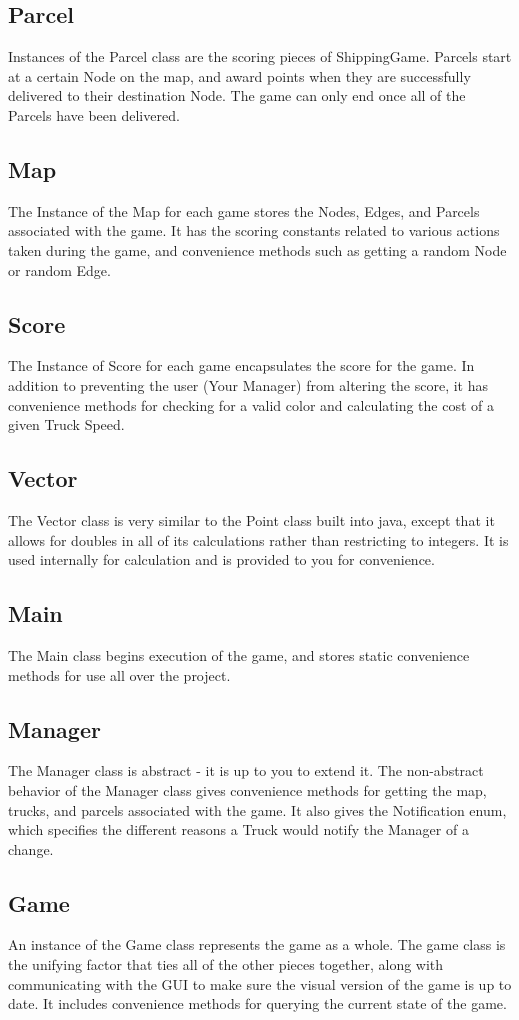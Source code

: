 \documentclass[11pt]{article}
\begin{document}
\subsection{Parcel}
Instances of the Parcel class are the scoring pieces of ShippingGame. Parcels start at a certain Node on the map, and award points when they are successfully delivered to their destination Node. The game can only end once all of the Parcels have been delivered.
\subsection{Map}
The Instance of the Map for each game stores the Nodes, Edges, and Parcels associated with the game. It has the scoring constants related to various actions taken during the game, and convenience methods such as getting a random Node or random Edge.
\subsection{Score}
The Instance of Score for each game encapsulates the score for the game. In addition to preventing the user (Your Manager) from altering the score, it has convenience methods for checking for a valid color and calculating the cost of a given Truck Speed.
\subsection{Vector}
The Vector class is very similar to the Point class built into java, except that it allows for doubles in all of its calculations rather than restricting to integers. It is used internally for calculation and is provided to you for convenience.
\subsection{Main}
The Main class begins execution of the game, and stores static convenience methods for use all over the project.
\subsection{Manager}
The Manager class is abstract - it is up to you to extend it. The non-abstract behavior of the Manager class gives convenience methods for getting the map, trucks, and parcels associated with the game. It also gives the Notification enum, which specifies the different reasons a Truck would notify the Manager of a change.
\subsection{Game}
An instance of the Game class represents the game as a whole. The game class is the unifying factor that ties all of the other pieces together, along with communicating with the GUI to make sure the visual version of the game is up to date. It includes convenience methods for querying the current state of the game.
\end{document}

